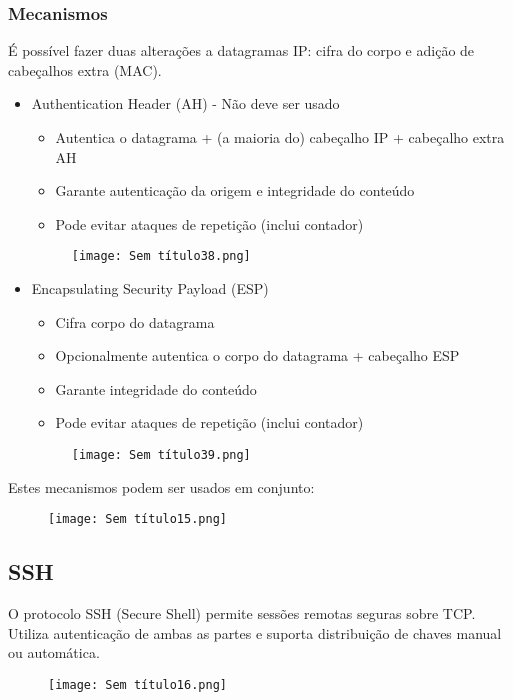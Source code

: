 \documentclass[10pt,a4paper]{report}
\begin{document}
\subsubsection{Mecanismos}
É possível fazer duas alterações a datagramas IP: cifra do corpo e adição de cabeçalhos extra (MAC).
\begin{itemize}
\item Authentication Header (AH) - Não deve ser usado
\begin{itemize}
\item Autentica o datagrama + (a maioria do) cabeçalho IP + cabeçalho extra AH
\item Garante autenticação da origem e integridade do conteúdo
\item Pode evitar ataques de repetição (inclui contador)
\end{itemize}
\begin{figure}[H]
\centering
\texttt{[image: Sem título38.png]}
\end{figure}
\item Encapsulating Security Payload (ESP)
\begin{itemize}
\item Cifra corpo do datagrama
\item Opcionalmente autentica o corpo do datagrama + cabeçalho ESP
\item Garante integridade do conteúdo
\item Pode evitar ataques de repetição (inclui contador)
\end{itemize}
\begin{figure}[H]
\centering
\texttt{[image: Sem título39.png]}
\end{figure}
\end{itemize}
Estes mecanismos podem ser usados em conjunto:
\begin{figure}[H]
\centering
\texttt{[image: Sem título15.png]}
\end{figure}
\subsection{SSH}
O protocolo SSH (Secure Shell) permite sessões remotas seguras sobre TCP. Utiliza autenticação de ambas as partes e suporta distribuição de chaves manual ou automática.
\begin{figure}[H]
\centering
\texttt{[image: Sem título16.png]}
\end{figure}
\end{document}
